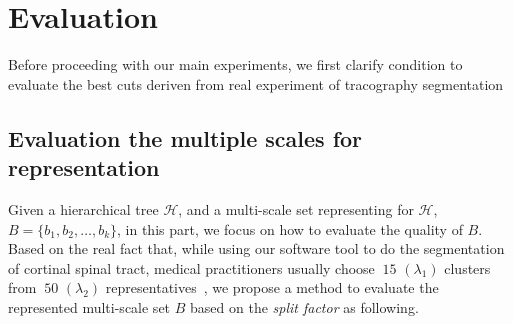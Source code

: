 \section{Evaluation}
\label{sec:evaluation}
Before proceeding with our main experiments, we first clarify condition to evaluate the best cuts deriven from real experiment of tracography segmentation 

\subsection{Evaluation the multiple scales for representation}
\label{subsec:evaluation_scales}
Given a hierarchical tree $\mathcal{H}$, and a multi-scale set representing for $\mathcal{H}$, $\mathsf{\textit{B}} = \{b_1, b_2, \ldots, b_k\}$, in this part, we focus on how to evaluate the quality of $\mathsf{\textit{B}}$.
Based on the real fact that, while using our software tool to do the segmentation of cortinal spinal tract, medical practitioners usually choose $~15$ $(\lambda_1)$ clusters from $~50$ $(\lambda_2)$ representatives~\cite{prni2013-boi}, we propose a method to evaluate the represented multi-scale set $\mathsf{\textit{B}}$ based on the \textit{split factor} as following.

